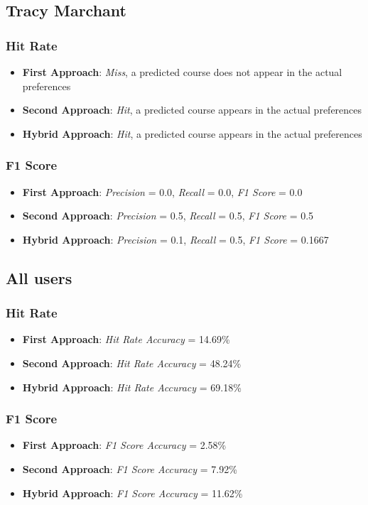 \subsection{Tracy Marchant}

\subsubsection{Hit Rate}

\begin{itemize}
    \item \textbf{First Approach}: \textit{Miss}, a predicted course does not appear in the actual preferences
    \item \textbf{Second Approach}: \textit{Hit}, a predicted course appears in the actual preferences
    \item \textbf{Hybrid Approach}: \textit{Hit}, a predicted course appears in the actual preferences
\end{itemize}

\subsubsection{F1 Score}

\begin{itemize}
    \item \textbf{First Approach}: \textit{Precision} = 0.0, \textit{Recall} = 0.0, \textit{F1 Score} = 0.0
    \item \textbf{Second Approach}: \textit{Precision} = 0.5, \textit{Recall} = 0.5, \textit{F1 Score} = 0.5
    \item \textbf{Hybrid Approach}: \textit{Precision} = 0.1, \textit{Recall} = 0.5, \textit{F1 Score} = 0.1667
\end{itemize}

\subsection{All users}

\subsubsection{Hit Rate}

\begin{itemize}
    \item \textbf{First Approach}: \textit{Hit Rate Accuracy} = 14.69\%
    \item \textbf{Second Approach}: \textit{Hit Rate Accuracy} = 48.24\%
    \item \textbf{Hybrid Approach}: \textit{Hit Rate Accuracy} = 69.18\%
\end{itemize}

\subsubsection{F1 Score}

\begin{itemize}
    \item \textbf{First Approach}: \textit{F1 Score Accuracy} = 2.58\%
    \item \textbf{Second Approach}: \textit{F1 Score Accuracy} = 7.92\%
    \item \textbf{Hybrid Approach}: \textit{F1 Score Accuracy} = 11.62\%
\end{itemize}